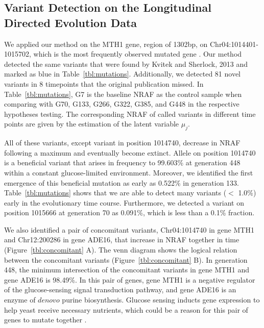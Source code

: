 \documentclass[11pt,reqno]{amsart}
\begin{document}
\subsection{Variant Detection on the Longitudinal Directed Evolution Data}
We applied our method on the MTH1 gene, region of 1302bp, on Chr04:1014401-1015702, which is the most frequently observed mutated gene \citep{kvitek2013whole}.
Our method detected the same variants that were found by Kvitek and Sherlock, 2013 and marked as blue in Table~\ref{tbl:mutations}.
Additionally, we detected 81 novel variants in 8 timepoints that the original publication missed.
In Table~\ref{tbl:mutations}, G7 is the baseline NRAF as the control sample when comparing with G70, G133, G266, G322, G385, and G448 in the respective hypotheses testing.
The corresponding NRAF of called variants in different time points are given by the estimation of the latent variable $\mu_j$.

All of these variants, except variant in position 1014740, decrease in NRAF following a maximum and eventually become extinct.
Allele on position 1014740 is a beneficial variant that arises in frequency to 99.603\% at generation 448 within a constant glucose-limited environment.
Moreover, we identified the first emergence of this beneficial mutation as early as 0.522\% in generation 133.
Table~\ref{tbl:mutations} shows that we are able to detect many variants ($<$ 1.0\%) early in the evolutionary time course.
Furthermore, we detected a variant on position 1015666 at generation 70 as 0.091\%, which is less than a 0.1\% fraction.

We also identified a pair of concomitant variants, Chr04:1014740 in gene MTH1 and Chr12:200286 in gene ADE16, that increase in NRAF together in time (Figure~\ref{tbl:concomitant} A).
The venn diagram shows the logical relation between the concomitant variants (Figure~\ref{tbl:concomitant} B).
In generation 448, the minimum intersection of the concomitant variants in gene MTH1 and gene ADE16 is 98.49\%.
In this pair of genes, gene MTH1 is a negative regulator of the glucose-sensing signal transduction pathway, and gene ADE16 is an enzyme of $\mathit{de novo}$ purine biosynthesis.
Glucose sensing inducts gene expression to help yeast receive necessary nutrients, which could be a reason for this pair of genes to mutate together \citep{johnston1999feasting}.
\end{document}
